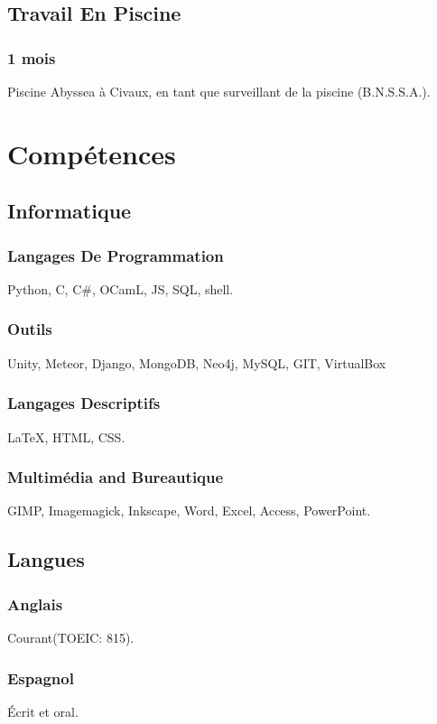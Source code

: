 \documentclass{article}
\begin{document}
\begin{multicols}{2}
            \subsection{Travail En Piscine}
                \subsubsection{1 mois}
                    Piscine Abyssea \`a Civaux, en tant que surveillant de la piscine (B.N.S.S.A.).

        \columnbreak

        \section{Comp\'etences}
            \subsection{Informatique}
                \subsubsection{Langages De Programmation}
                    Python, C, C\#, OCamL, JS, SQL, shell.
                \subsubsection{Outils}
                    Unity, Meteor, Django,  MongoDB, Neo4j, MySQL, GIT, VirtualBox
                \subsubsection{Langages Descriptifs}
                    {\LaTeX}, HTML, CSS.
                \subsubsection{Multim\'edia and Bureautique}
                    GIMP, Imagemagick, Inkscape, Word, Excel, Access, PowerPoint.
            \subsection{Langues}
                \subsubsection{Anglais}
                    Courant(TOEIC: 815).
                \subsubsection{Espagnol}
                    \'Ecrit et oral.

\end{multicols}
\end{document}
